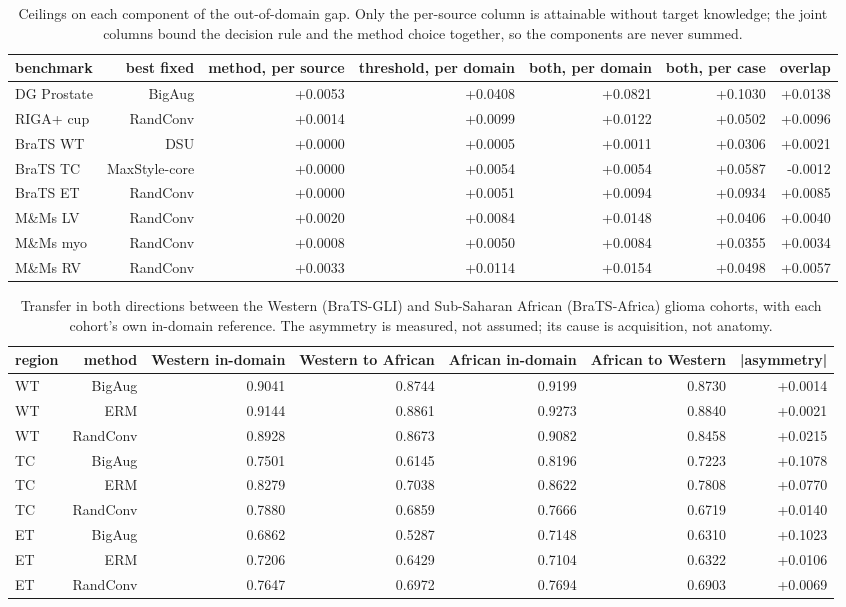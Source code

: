 \begin{table}[t]
\centering
\caption{Ceilings on each component of the out-of-domain gap. Only the per-source column is attainable without target knowledge; the joint columns bound the decision rule and the method choice together, so the components are never summed.}
\label{tab:gapacct}
\scriptsize
\setlength{\tabcolsep}{2pt}
\renewcommand{\arraystretch}{1.05}
\begin{tabular}{lrrrrrr}
\hline
benchmark & best fixed & method, per source & threshold, per domain & both, per domain & both, per case & overlap \\
\hline
DG Prostate & BigAug & +0.0053 & +0.0408 & +0.0821 & +0.1030 & +0.0138 \\
RIGA+ cup & RandConv & +0.0014 & +0.0099 & +0.0122 & +0.0502 & +0.0096 \\
BraTS WT & DSU & +0.0000 & +0.0005 & +0.0011 & +0.0306 & +0.0021 \\
BraTS TC & MaxStyle-core & +0.0000 & +0.0054 & +0.0054 & +0.0587 & -0.0012 \\
BraTS ET & RandConv & +0.0000 & +0.0051 & +0.0094 & +0.0934 & +0.0085 \\
M\&Ms LV & RandConv & +0.0020 & +0.0084 & +0.0148 & +0.0406 & +0.0040 \\
M\&Ms myo & RandConv & +0.0008 & +0.0050 & +0.0084 & +0.0355 & +0.0034 \\
M\&Ms RV & RandConv & +0.0033 & +0.0114 & +0.0154 & +0.0498 & +0.0057 \\
\hline
\end{tabular}
\end{table}

\begin{table}[t]
\centering
\caption{Transfer in both directions between the Western (BraTS-GLI) and Sub-Saharan African (BraTS-Africa) glioma cohorts, with each cohort's own in-domain reference. The asymmetry is measured, not assumed; its cause is acquisition, not anatomy.}
\label{tab:africa}
\scriptsize
\setlength{\tabcolsep}{2pt}
\renewcommand{\arraystretch}{1.05}
\begin{tabular}{lrrrrrr}
\hline
region & method & Western in-domain & Western to African & African in-domain & African to Western & |asymmetry| \\
\hline
WT & BigAug & 0.9041 & 0.8744 & 0.9199 & 0.8730 & +0.0014 \\
WT & ERM & 0.9144 & 0.8861 & 0.9273 & 0.8840 & +0.0021 \\
WT & RandConv & 0.8928 & 0.8673 & 0.9082 & 0.8458 & +0.0215 \\
TC & BigAug & 0.7501 & 0.6145 & 0.8196 & 0.7223 & +0.1078 \\
TC & ERM & 0.8279 & 0.7038 & 0.8622 & 0.7808 & +0.0770 \\
TC & RandConv & 0.7880 & 0.6859 & 0.7666 & 0.6719 & +0.0140 \\
ET & BigAug & 0.6862 & 0.5287 & 0.7148 & 0.6310 & +0.1023 \\
ET & ERM & 0.7206 & 0.6429 & 0.7104 & 0.6322 & +0.0106 \\
ET & RandConv & 0.7647 & 0.6972 & 0.7694 & 0.6903 & +0.0069 \\
\hline
\end{tabular}
\end{table}
